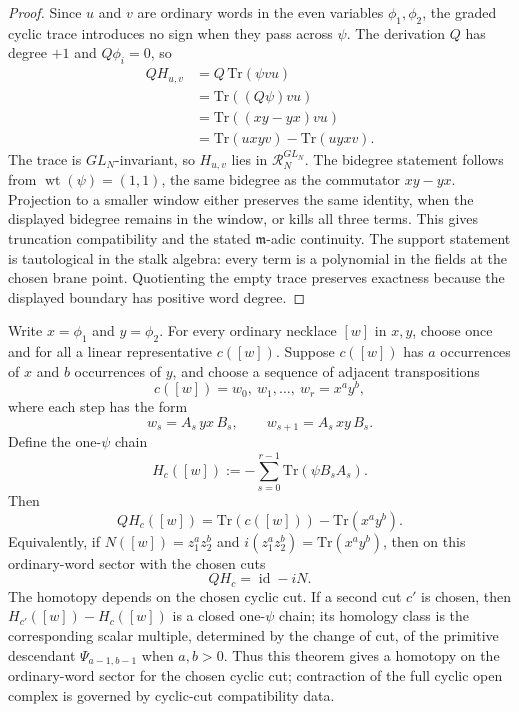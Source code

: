 \documentclass[11pt]{memoir}
\begin{document}
\begin{proof}
  Since \(u\) and \(v\) are ordinary words in the even variables
  \(\phi_1,\phi_2\), the graded cyclic trace introduces no sign when
  they pass across \(\psi\).  The derivation \(Q\) has degree \(+1\) and
  \(Q\phi_i=0\), so
  \begin{align*}
    QH_{u,v}
    &=Q\,\mathrm{Tr}(\psi vu)\\
    &=\mathrm{Tr}((Q\psi)vu)\\
    &=\mathrm{Tr}((xy-yx)vu)\\
    &=\mathrm{Tr}(uxyv)-\mathrm{Tr}(uyxv).
  \end{align*}
  The trace is \(GL_N\)-invariant, so \(H_{u,v}\) lies in
  \(\mathcal R_N^{GL_N}\).  The bidegree statement follows from
  \(\operatorname{wt}(\psi)=(1,1)\), the same bidegree as the commutator
  \(xy-yx\).  Projection to a smaller window either preserves the same
  identity, when the displayed bidegree remains in the window, or kills
  all three terms.  This gives truncation compatibility and the stated
  \(\mathfrak m\)-adic continuity.  The support statement is tautological
  in the stalk algebra: every term is a polynomial in the fields at the
  chosen brane point.  Quotienting the empty trace preserves exactness
  because the displayed boundary has positive word degree.
\end{proof}

\begin{thm}
\label{thm:normal-ordering-cyclic-word-homotopy}
  Write \(x=\phi_1\) and \(y=\phi_2\).  For every ordinary necklace
  \([w]\) in \(x,y\), choose once and for all a linear representative
  \(c([w])\).  Suppose \(c([w])\) has \(a\) occurrences of \(x\) and \(b\)
  occurrences of \(y\), and choose a sequence of adjacent transpositions
  \[
    c([w])=w_0,\ w_1,\ldots,\ w_r=x^ay^b,
  \]
  where each step has the form
  \[
    w_s=A_s\,yx\,B_s,\qquad w_{s+1}=A_s\,xy\,B_s .
  \]
  Define the one-\(\psi\) chain
  \[
    H_c([w]):=-\sum_{s=0}^{r-1}\mathrm{Tr}(\psi B_sA_s).
  \]
  Then
  \[
    QH_c([w])=\mathrm{Tr}(c([w]))-\mathrm{Tr}(x^ay^b).
  \]
  Equivalently, if
  \(N([w])=z_1^az_2^b\) and
  \(i(z_1^az_2^b)=\mathrm{Tr}(x^ay^b)\), then on this ordinary-word
  sector with the chosen cuts
  \[
    QH_c=\operatorname{id}-iN.
  \]
  The homotopy depends on the chosen cyclic cut.  If a second cut
  \(c'\) is chosen, then \(H_{c'}([w])-H_c([w])\) is a closed
  one-\(\psi\) chain; its homology class is the corresponding
  scalar multiple, determined by the change of cut, of the primitive
  descendant \(\Psi_{a-1,b-1}\) when \(a,b>0\).  Thus this theorem gives a
  homotopy on the ordinary-word sector for the chosen cyclic cut; contraction
  of the full cyclic open complex is governed by cyclic-cut compatibility
  data.
\end{thm}
\end{document}
